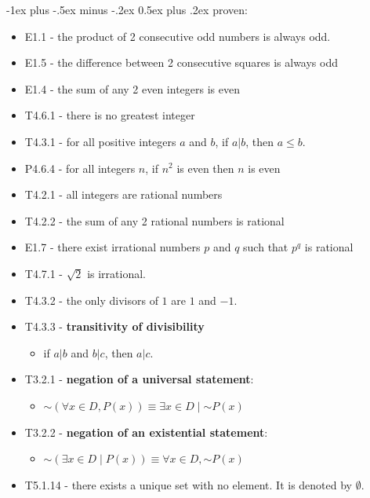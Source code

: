 \documentclass[10pt, landscape]{article}
\makeatletter
\renewcommand{\section}{\@startsection{section}{1}{0mm}%
                                {-1ex plus -.5ex minus -.2ex}%
                                {0.5ex plus .2ex}%
                                {\normalfont\large\bfseries}}
\renewcommand{\lnot}{\mathord{\sim}}
\renewcommand{\bf}[1]{\textbf{#1}}
\makeatother
\begin{document}
\begin{multicols*}{3}
    \section{proven:}
    \begin{itemize}
        \item E1.1 - the product of 2 consecutive odd numbers is always odd.
        \item E1.5 - the difference between 2 consecutive squares is always odd
        \item E1.4 - the sum of any 2 even integers is even
        \item T4.6.1 - there is no greatest integer
        \item T4.3.1 - for all positive integers $a$ and $b$, if $a \vert b$, then $a \leq b$.
        \item P4.6.4 - for all integers $n$, if $n^2$ is even then $n$ is even
        \item T4.2.1 - all integers are rational numbers
        \item T4.2.2 - the sum of any 2 rational numbers is rational
        \item E1.7 - there exist irrational numbers $p$ and $q$ such that $p^q$ is rational
        \item T4.7.1 - $\sqrt{2}$ is irrational.
        \item T4.3.2 - the only divisors of $1$ are $1$ and $-1$.
        \item T4.3.3 - \bf{transitivity of divisibility} 
        \begin{itemize}
            \item if $a\vert b$ and $b \vert c$, then $a \vert c$.
        \end{itemize}
        \item T3.2.1 - \bf{negation of a universal statement}: 
        \begin{itemize}
            \item $\lnot (\forall x \in D, P(x)) \equiv \exists x \in D \mid \lnot P(x)$
        \end{itemize}
        \item T3.2.2 - \bf{negation of an existential statement}: 
        \begin{itemize}
            \item $\lnot (\exists x \in D \mid P(x)) \equiv \forall x \in D, \lnot P(x)$
        \end{itemize}
        \item T5.1.14 - there exists a unique set with no element. It is denoted by $\emptyset$.

\end{itemize}
\end{multicols*}
\end{document}
